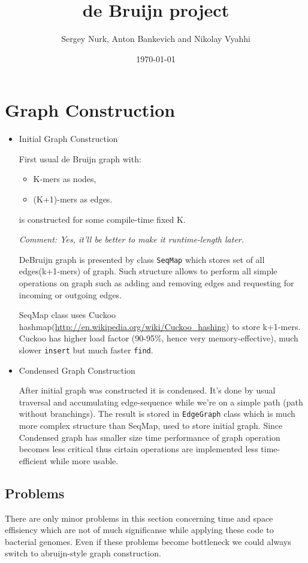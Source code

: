 \documentclass[14pt]{article}
\title{de Bruijn project}
\author{Sergey Nurk, Anton Bankevich and Nikolay Vyahhi}
\date{\today}
\begin{document}
\maketitle

\section{Graph Construction}
\begin{itemize}
\item Initial Graph Construction

First usual de Bruijn graph with:
\begin{itemize}
\item K-mers as nodes,
\item (K+1)-mers as edges.
\end{itemize}
is constructed for some compile-time fixed K. 

\textit{Comment: Yes, it'll be better to make it runtime-length later.}

DeBruijn graph is presented by class \texttt{SeqMap} which stores set of all edges(k+1-mers) of graph. Such structure allows to perform all simple operations on graph such as adding and removing edges and requesting for incoming or outgoing edges.

SeqMap class uses Cuckoo hashmap(\url{http://en.wikipedia.org/wiki/Cuckoo_hashing}) to store k+1-mers. Cuckoo has higher load factor (90-95\%, hence very memory-effective), much slower \texttt{insert} but much faster \texttt{find}.

\item Condensed Graph Construction

After initial graph was constructed it is condensed. It's done by usual traversal and accumulating edge-sequence while we're on a simple path (path without branchings). The result is stored in \texttt{EdgeGraph} class which is much more complex structure than SeqMap, used to store initial graph. Since Condensed graph has smaller size time performance of graph operation becomes less critical thus cirtain operations are implemented less time-efficient while more usable.
\end{itemize}

\subsection{Problems}
There are only minor problems in this section concerning time and space effisiency which are not of much significanse while applying these code to bacterial genomes. Even if these problems become bottleneck we could always switch to abruijn-style graph construction.
\end{document}
